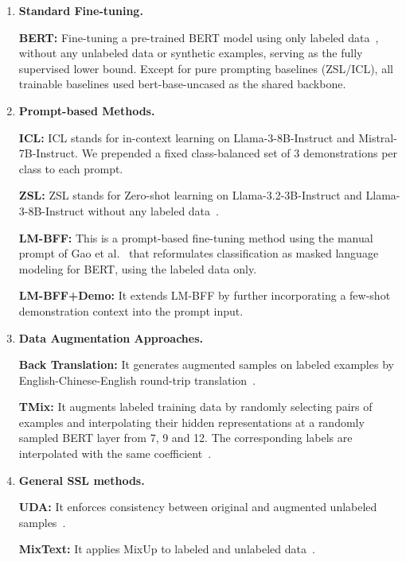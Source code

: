 \documentclass[lettersize,journal]{IEEEtran}
\begin{document}
\begin{enumerate}
	
	\item \textbf{Standard Fine-tuning.}
	
	\textbf{BERT:} Fine-tuning a pre-trained BERT model using only labeled data~\cite{DBLP:conf/naacl/DevlinCLT19}, without any unlabeled data or synthetic examples, serving as the fully supervised lower bound. Except for pure prompting baselines (ZSL/ICL), all trainable baselines used bert-base-uncased as the shared backbone.
	
	\item \textbf{Prompt-based Methods.}
	
	\textbf{ICL:} ICL stands for in-context learning on Llama-3-8B-Instruct and Mistral-7B-Instruct. We prepended a fixed class-balanced set of 3 demonstrations per class to each prompt.~\cite{DBLP:conf/nips/BrownMRSKDNSSAA20}
	
	\textbf{ZSL:} ZSL stands for Zero-shot learning on Llama-3.2-3B-Instruct and Llama-3-8B-Instruct without any labeled data~\cite{DBLP:conf/nips/BrownMRSKDNSSAA20}.
	
	\textbf{LM-BFF:} This is a prompt-based fine-tuning method using the manual prompt of Gao et al.~\cite{DBLP:conf/acl/GaoFC20} that reformulates classification as masked language modeling for BERT, using the labeled data only.
	
	\textbf{LM-BFF+Demo:} It extends LM-BFF by further incorporating a few-shot demonstration context into the prompt input.
	
	\item \textbf{Data Augmentation Approaches.}
	
	\textbf{Back Translation:} It generates augmented samples on labeled examples by English-Chinese-English round-trip translation~\cite{edunov2018understanding}.
	
	\textbf{TMix:} It augments labeled training data by randomly selecting pairs of examples and interpolating their hidden representations at a randomly sampled BERT layer from 7, 9 and 12. The corresponding labels are interpolated with the same coefficient~\cite{DBLP:conf/acl/ChenYY20}.
	
	\item \textbf{General SSL methods.}
	
	\textbf{UDA:} It enforces consistency between original and augmented unlabeled samples~\cite{DBLP:conf/nips/XieDHL020}.
	
	\textbf{MixText:} It applies MixUp to labeled and unlabeled data~\cite{DBLP:conf/acl/ChenYY20}.
	

\end{enumerate}
\end{document}
